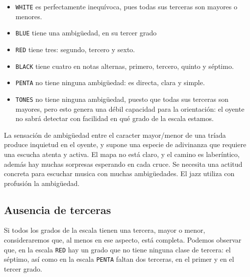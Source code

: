 \documentclass[]{article}
\providecommand{\tightlist}{%
  \setlength{
\itemsep}{0pt}\setlength{\parskip}{0pt}}
\begin{document}
\begin{itemize}   \tightlist
  \item  \texttt{WHITE} es perfectamente inequívoca, pues todas sus terceras         son mayores o menores.
  \item  \texttt{BLUE} tiene una ambigüedad, en su tercer grado
  \item  \texttt{RED} tiene tres: segundo, tercero y sexto.
  \item  \texttt{BLACK} tiene cuatro en notas alternas, primero, tercero,         quinto y séptimo.
  \item  \texttt{PENTA} no tiene ninguna ambigüedad: es directa, clara y         simple.
  \item  \texttt{TONES} no tiene ninguna ambigüedad, puesto que todas sus         terceras son mayores, pero esto genera una débil capacidad para la         orientación: el oyente no sabrá detectar con facilidad en qué grado de         la escala estamos.
\end{itemize}

La sensación de ambigüedad entre el caracter mayor/menor de una tríada produce inquietud en el oyente, y supone una especie de adivinanza que requiere una escucha atenta y activa. El mapa no está claro, y el camino es laberíntico, además hay muchas sorpresas esperando en cada cruce. Se necesita una actitud concreta para escuchar musica con muchas ambigüedades. El jazz utiliza con profusión la ambigüedad.

\subsection{Ausencia de terceras}

Si todos los grados de la escala tienen una tercera, mayor o menor, consideraremos que, al menos en ese aspecto, está completa. Podemos observar que, en la escala \texttt{RED} hay un grado que no tiene ninguna clase de tercera: el séptimo, así como en la escala \texttt{PENTA} faltan dos terceras, en el primer y en el tercer grado.
\end{document}
